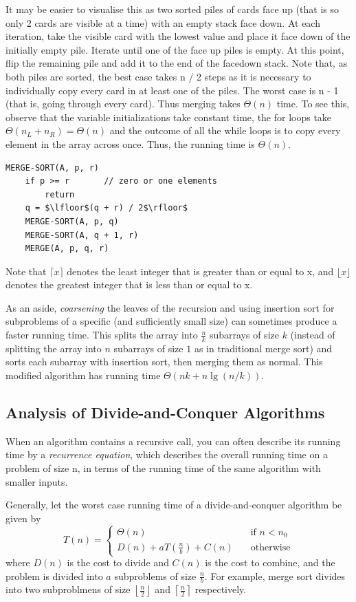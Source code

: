 \documentclass[12pt]{article}
\begin{document}
It may be easier to visualise this as two sorted piles of cards face up (that is so only 2 cards are visible at a time) with an empty stack face down. At each iteration,
take the visible card with the lowest value and place it face down of the initially empty pile. Iterate until one of the face up piles is empty.
At this point, flip the remaining pile and add it to the end of the facedown stack. Note that, as both piles are sorted,
the best case takes n / 2 steps as it is necessary to individually copy every card in at least one of the
piles. The worst case is n - 1 (that is, going through every card). Thus merging takes $\Theta(n)$ time. To see this,
observe that the variable initializations take constant time, the for loops take $\Theta(n_L + n_R) = \Theta(n)$
and the outcome of all the while loops is to copy every element in the array across once. Thus, the running time is $\Theta(n)$.

\begin{lstlisting}[mathescape]
    MERGE-SORT(A, p, r)
    if p >= r       // zero or one elements
        return
    q = $\lfloor$(q + r) / 2$\rfloor$
    MERGE-SORT(A, p, q)
    MERGE-SORT(A, q + 1, r)
    MERGE(A, p, q, r)
\end{lstlisting}
Note that $\lceil x \rceil$ denotes the least integer that is greater than or equal to x, and $\lfloor x \rfloor$
denotes the greatest integer that is less than or equal to x.

As an aside, \textit{coarsening} the leaves of the recursion and using insertion sort for subproblems of
a specific (and sufficiently small size) can sometimes produce a faster running time. This splits the array into $\frac{n}{k}$
subarrays of size $k$ (instead of splitting the array into $n$ subarrays of size $1$ as in traditional merge sort) and sorts each
subarray with insertion sort, then merging them as normal. This modified algorithm has running time $\Theta(nk + n\lg(n/k))$.

\subsection{Analysis of Divide-and-Conquer Algorithms}
When an algorithm contains a recursive call, you can often describe its running time by a \textit{recurrence equation}, which
describes the overall running time on a problem of size n, in terms of the running time of the same algorithm with smaller inputs.

Generally, let the worst case running time of a divide-and-conquer algorithm be given by
\[ T(n) =
  \begin{cases}
    \Theta(n)       & \quad \text{if } n < n_0\\
    D(n) + aT(\frac{n}{b}) + C(n)  & \quad \text{otherwise}
  \end{cases}
\]
where $D(n)$ is the cost to divide and $C(n)$ is the cost to combine, and the problem is divided into
$a$ subproblems of size $\frac{n}{b}$. For example, merge sort divides into two subproblmens of size
$\left \lfloor \frac{n}{2} \right \rfloor$ and $\left \lceil \frac{n}{2} \right \rceil$ respectively.
\end{document}
